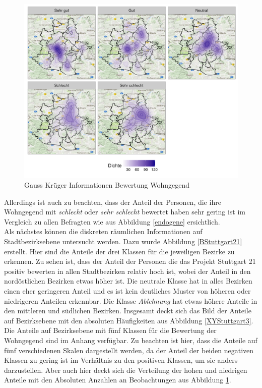 \documentclass{Vorlage}
\begin{document}
\begin{figure}[h]
 \begin{center}
 \includegraphics[scale=0.8]{Pictures/XYWohnG5.png}
 \caption{Gauss Krüger Informationen Bewertung Wohngegend}
 \label{XYWohnG5}
 \end{center}
\end{figure}

Allerdings ist auch zu beachten, dass der Anteil der Personen, die ihre Wohngegend mit \textit{schlecht} oder \textit{sehr schlecht} bewertet haben sehr gering ist im Vergleich zu allen Befragten wie aus Abbildung \ref{endogene} ersichtlich.\\
Als nächstes können die diskreten räumlichen Informationen auf Stadtbezirksebene untersucht werden. Dazu wurde Abbildung \ref{BStuttgart21} erstellt. Hier sind die Anteile der drei Klassen für die jeweiligen Bezirke zu erkennen. Zu sehen ist, dass der Anteil der Personen die das Projekt Stuttgart 21 positiv bewerten in allen Stadtbezirken relativ hoch ist, wobei der Anteil in den nordöstlichen Bezirken etwas höher ist. Die neutrale Klasse hat in alles Bezirken einen eher geringeren Anteil und es ist kein deutliches Muster von höheren oder niedrigeren Anteilen erkennbar. Die Klasse \textit{Ablehnung} hat etwas höhere Anteile in den mittleren und südlichen Bezirken. Insgesamt deckt sich das Bild der Anteile auf Bezirksebene mit den absoluten Häufigkeiten aus Abbildung \ref{XYStuttgart3}. Die Anteile auf Bezirksebene mit fünf Klassen für die Bewertung der Wohngegend sind im Anhang verfügbar. Zu beachten ist hier, dass die Anteile auf fünf verschiedenen Skalen dargestellt werden, da der Anteil der beiden negativen Klassen zu gering ist im Verhältnis zu den positiven Klassen, um sie anders darzustellen. Aber auch hier deckt sich die Verteilung der hohen und niedrigen Anteile mit den Absoluten Anzahlen an Beobachtungen aus Abbildung \ref{XYWohnG5}.
\end{document}
